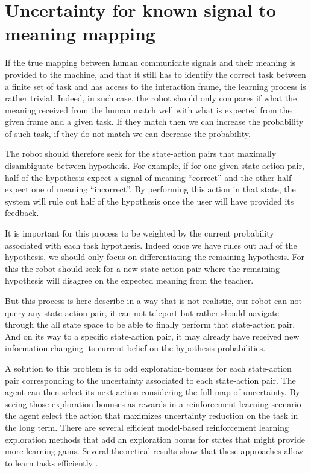\section{Uncertainty for known signal to meaning mapping}

If the true mapping between human communicate signals and their meaning is provided to the machine, and that it still has to identify the correct task between a finite set of task and has access to the interaction frame, the learning process is rather trivial. Indeed, in such case, the robot should only compares if what the meaning received from the human match well with what is expected from the given frame and a given task. If they match then we can increase the probability of such task, if they do not match we can decrease the probability.

The robot should therefore seek for the state-action pairs that maximally disambiguate between hypothesis. For example, if for one given state-action pair, half of the hypothesis expect a signal of meaning ``correct'' and the other half expect one of meaning ``incorrect''. By performing this action in that state, the system will rule out half of the hypothesis once the user will have provided its feedback. 

It is important for this process to be weighted by the current probability associated with each task hypothesis. Indeed once we have rules out half of the hypothesis, we should only focus on differentiating the remaining hypothesis. For this the robot should seek for a new state-action pair where the remaining hypothesis will disagree on the expected meaning from the teacher.

But this process is here describe in a way that is not realistic, our robot can not query any state-action pair, it can not teleport but rather should navigate through the all state space to be able to finally perform that state-action pair. And on its way to a specific state-action pair, it may already have received new information changing its current belief on the hypothesis probabilities.

A solution to this problem is to add exploration-bonuses for each state-action pair corresponding to the uncertainty associated to each state-action pair. The agent can then select its next action considering the full map of uncertainty. By seeing those exploration-bonuses as rewards in a reinforcement learning scenario the agent select the action that maximizes uncertainty reduction on the task in the long term. There are several efficient model-based reinforcement learning exploration methods that add an exploration bonus for states that might provide more learning gains. Several theoretical results show that these approaches allow to learn tasks efficiently \cite{brafman2003r,kolter2009near}. 



